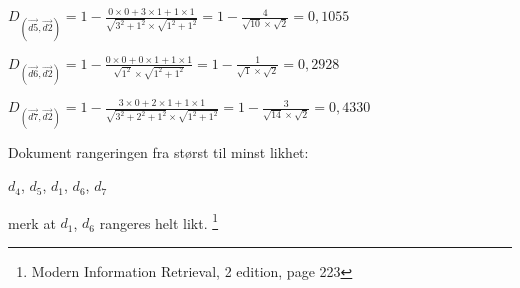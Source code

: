 \documentclass[]{article}
\begin{document}
$D_{(\overrightarrow{d5},\overrightarrow{d2})} = 1 - \frac{0\times0+3\times1+1\times1}{\sqrt{3^2+1^2}\times\sqrt{1^2+1^2}} = 1 - \frac{4}{\sqrt{10}\times\sqrt{2}} = 0,1055$
\vspace{2 mm}

$D_{(\overrightarrow{d6},\overrightarrow{d2})} = 1 - \frac{0\times0+0\times1+1\times1}{\sqrt{1^2}\times\sqrt{1^2 + 1^2}} = 1 - \frac{1}{\sqrt{1}\times\sqrt{2}} = 0,2928$
\vspace{2 mm}

$D_{(\overrightarrow{d7},\overrightarrow{d2})} = 1 - \frac{3\times0+2\times1+1\times1}{\sqrt{3^2+2^2+1^2}\times\sqrt{1^2+1^2}} = 1 - \frac{3}{\sqrt{14}\times\sqrt{2}} = 0,4330$
\vspace{10 mm}

Dokument rangeringen fra størst til minst likhet:
\vspace{2 mm}

\indent\indent$d_4$, $d_5$, $d_1$, $d_6$, $d_7$
\vspace{1 mm}

\indent\indent merk at $d_1$, $d_6$ rangeres helt likt.
\vspace{20 mm}
\let\thefootnote\relax\footnote{Modern Information Retrieval, 2 edition, page 223}
\end{document}
